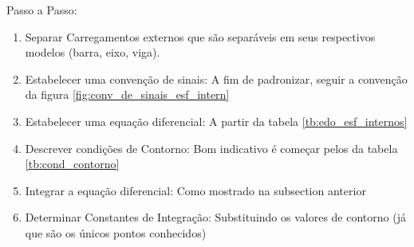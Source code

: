 \documentclass{article}
\begin{document}
        Passo a Passo:
        \begin{enumerate}\addtocounter{enumi}{-1}\tiny
            \item Separar Carregamentos externos que são separáveis em seus respectivos modelos (barra, eixo, viga).
            \item Estabelecer uma convenção de sinais: A fim de padronizar, seguir a convenção da figura \ref{fig:conv_de_sinais_esf_intern}
            \item Estabelecer uma equação diferencial: A partir da tabela \ref{tb:edo_esf_internos}
            \item Descrever condições de Contorno: Bom indicativo é começar pelos da tabela \ref{tb:cond_contorno}
            \item Integrar a equação diferencial: Como mostrado na subsection anterior
            \item Determinar Constantes de Integração: Substituindo os valores de contorno (já que são os únicos pontos conhecidos)
        \end{enumerate}




    
\end{document}
